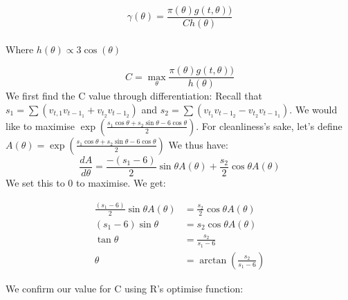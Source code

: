 \documentclass[12pt,halfline,a4paper,]{ouparticle}
\begin{document}
\[\gamma(\theta)= \frac{\pi (\theta) g(t,\theta))}{Ch{(\theta)}}\]\\
Where \(h(\theta) \propto 3\cos(\theta)\)

\[ C = \max_\theta \frac{\pi (\theta) g(t,\theta))}{h{(\theta)}}\] We
first find the C value through differentiation: Recall that
\(s_1 =\sum(v_{t,1} v_{t-1_1} +v_{t_2} v_{t-1_2})\) and
\(s_2 =\sum(v_{t_1} v_{t-1_2} -v_{t_2} v_{t-1_1})\). We would like to
maximise
\(\exp{(\frac{s_1\cos\theta + s_2 \sin\theta - 6\cos\theta}{2})}\). For
cleanliness's sake, let's define
\(A(\theta) = \exp{(\frac{s_1\cos\theta + s_2 \sin\theta - 6\cos\theta}{2})}\)
We thus have: \[
\frac{dA}{d\theta} = \frac{-(s_1 - 6)}{2}\sin\theta A(\theta) + \frac{s_2}{2}\cos\theta A(\theta) 
\] We set this to 0 to maximise. We get:

\begin{align}
 \frac{(s_1 - 6)}{2}\sin\theta A(\theta) &= \frac{s_2}{2}\cos\theta A(\theta) \\
 (s_1 - 6) \sin\theta &= s_2 \cos\theta A(\theta)\\
 \tan\theta &= \frac{s_2}{s_1 - 6}\\
 \theta &= \arctan (\frac{s_2}{s_1 - 6})
\end{align}

We confirm our value for C using R's optimise function:
\end{document}
